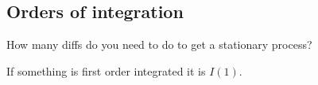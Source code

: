 
\subsection{Orders of integration}

How many diffs do you need to do to get a stationary process?

If something is first order integrated it is \(I(1)\).

